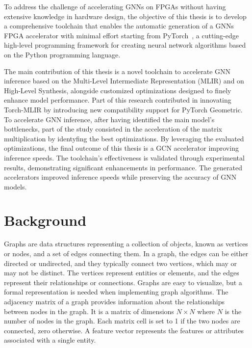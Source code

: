 \documentclass[11pt,a4paper,twocolumn]{article}
\begin{document}
To address the challenge of accelerating GNNs on FPGAs without having extensive knowledge in hardware design, the objective of this thesis is to develop a comprehensive toolchain that enables the automatic generation of a GNNs FPGA accelerator with minimal effort
starting from PyTorch~\cite{DBLP:journals/corr/abs-1912-01703}, a cutting-edge high-level programming framework for creating neural network algorithms based on the Python programming language.

The main contribution of this thesis is a novel toolchain to accelerate GNN inference based on the Multi-Level Intermediate Representation (MLIR) and on High-Level Synthesis, alongside customized optimizations designed to finely enhance model performance.
Part of this research contributed in innovating Torch-MLIR by introducing new compatibility support for PyTorch Geometric.
To accelerate GNN inference, after having identified the main model's bottlenecks, part of the study consisted in the acceleration of the matrix multiplication by identyfing the best optimizations.
By leveraging the evaluated optimizations, the final outcome of this thesis is a GCN accelerator improving inference speeds.
The toolchain's effectiveness is validated through experimental results, demonstrating significant enhancements in performance.
The generated accelerators improved inference speeds while preserving the accuracy of GNN models.


\section{Background}
\label{sec:background}%

Graphs are data structures representing a collection of objects, known as vertices or nodes, and a set of edges connecting them.
In a graph, the edges can be either directed or undirected, and they typically connect two vertices, which may or may not be distinct.
The vertices represent entities or elements, and the edges represent their relationships or connections.
Graphs are easy to visualize, but a formal representation is needed when implementing graph algorithms.
The adjacency matrix of a graph provides information about the relationships between nodes in the graph.
It is a matrix of dimensions $N \times N$ where $N$ is the number of nodes in the graph. Each matrix cell is set to 1 if the two nodes are connected, zero otherwise.
A feature vector represents the features or attributes associated with a single entity.
\end{document}
